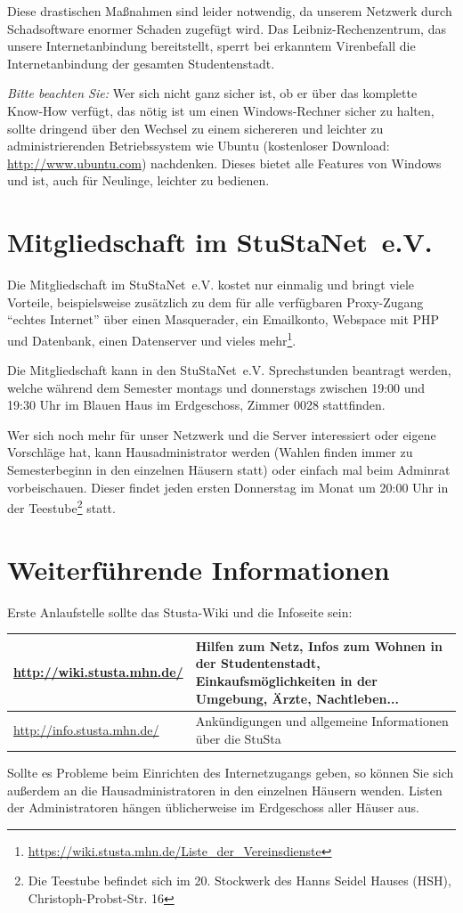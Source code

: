 \documentclass[a4paper,12pt]{scrartcl}
\begin{document}
Diese drastischen Maßnahmen sind leider notwendig, da unserem Netzwerk durch Schadsoftware enormer Schaden zugefügt wird. Das Leibniz-Rechenzentrum, das unsere Internetanbindung bereitstellt, sperrt bei erkanntem Virenbefall die Internetanbindung der gesamten Studentenstadt.

\emph{Bitte beachten Sie:} Wer sich nicht ganz sicher ist, ob er über das komplette Know-How verfügt, das nötig ist um einen Windows-Rechner sicher zu halten, sollte dringend über den Wechsel zu einem sichereren und leichter zu administrierenden Betriebssystem wie Ubuntu (kostenloser Download: \url{http://www.ubuntu.com}) nachdenken. Dieses bietet alle Features von Windows und ist, auch für Neulinge, leichter zu bedienen.


\section*{Mitgliedschaft im StuStaNet~e.V.}

Die Mitgliedschaft im StuStaNet~e.V. kostet nur einmalig  und bringt viele Vorteile, beispielsweise zusätzlich zu dem für alle verfügbaren Proxy-Zugang "`echtes Internet"' über einen Masquerader, ein Emailkonto, Webspace mit PHP und Datenbank, einen Datenserver und vieles mehr\footnote{\url{https://wiki.stusta.mhn.de/Liste\_der\_Vereinsdienste}}.

Die Mitgliedschaft kann in den StuStaNet~e.V. Sprechstunden beantragt werden, welche während dem Semester montags und donnerstags zwischen 19:00 und 19:30 Uhr im Blauen Haus im Erdgeschoss, Zimmer 0028 stattfinden.

Wer sich noch mehr für unser Netzwerk und die Server interessiert oder eigene Vorschläge hat, kann Hausadministrator werden (Wahlen finden immer zu Semesterbeginn in den einzelnen Häusern statt) oder einfach mal beim Adminrat vorbeischauen. Dieser findet jeden ersten Donnerstag im Monat um 20:00 Uhr in der Teestube\footnote{Die Teestube befindet sich im 20. Stockwerk des Hanns Seidel Hauses (HSH), Christoph-Probst-Str. 16} statt.

\section*{Weiterführende Informationen}

Erste Anlaufstelle sollte das Stusta-Wiki und die Infoseite sein:

\begin{center}
  \begin{tabularx}{\linewidth}{|lX|}
    \hline
    \url{http://wiki.stusta.mhn.de/} & Hilfen zum Netz, Infos zum Wohnen in der Studentenstadt, Einkaufsmöglichkeiten in der Umgebung, Ärzte, Nachtleben...\\
    \hline
    \url{http://info.stusta.mhn.de/} & Ankündigungen und allgemeine Informationen über die StuSta\\
    \hline
  \end{tabularx}
\end{center}
Sollte es Probleme beim Einrichten des Internetzugangs geben, so können Sie sich außerdem an die Hausadministratoren in den einzelnen Häusern wenden. Listen der Administratoren hängen üblicherweise im Erdgeschoss aller Häuser aus.
\end{document}
